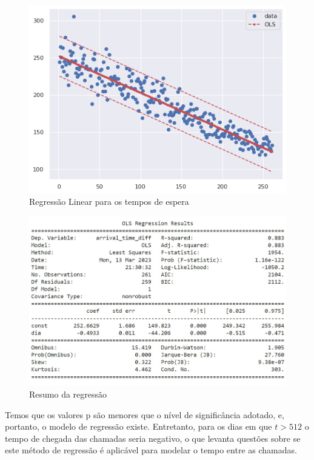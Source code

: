 \begin{figure}[H]
    \includegraphics{analise-de-dados/regressao/regressao_OLS.png}
    \caption{Regressão Linear para os tempos de espera}
    \label{fig: plot_OLS}
\end{figure}

\begin{figure}[H]
    \includegraphics[scale = 0.85]{analise-de-dados/regressao/OLS_summary.jpg}
    \caption{Resumo da regressão}
    \label{fig: sum_OLS}
\end{figure}

Temos que os valores p são menores que o nível de significância adotado, e, portanto, o modelo de regressão existe. Entretanto, para os dias em que $t > 512$ o tempo de chegada das chamadas seria negativo, o que levanta questões sobre se este método de regressão é aplicável para modelar o tempo entre as chamadas.

